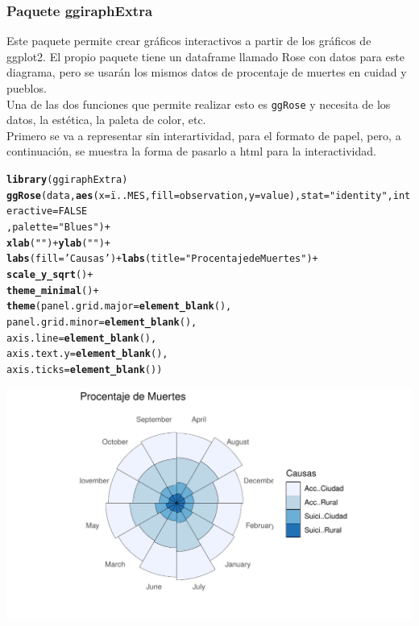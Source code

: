 \documentclass{article}\usepackage[]{graphicx}\usepackage[]{color}
\makeatletter
\def\maxwidth{ %
  \ifdim\Gin@nat@width>\linewidth
    \linewidth
  \else
    \Gin@nat@width
  \fi
}
\newcommand{\hlnum}[1]{\textcolor[rgb]{0.686,0.059,0.569}{#1}}%
\newcommand{\hlstr}[1]{\textcolor[rgb]{0.192,0.494,0.8}{#1}}%
\newcommand{\hlopt}[1]{\textcolor[rgb]{0,0,0}{#1}}%
\newcommand{\hlstd}[1]{\textcolor[rgb]{0.345,0.345,0.345}{#1}}%
\newcommand{\hlkwc}[1]{\textcolor[rgb]{0.333,0.667,0.333}{#1}}%
\newcommand{\hlkwd}[1]{\textcolor[rgb]{0.737,0.353,0.396}{\textbf{#1}}}%
\newenvironment{kframe}{%
 \def\at@end@of@kframe{}%
 \ifinner\ifhmode%
  \def\at@end@of@kframe{\end{minipage}}%
  \begin{minipage}{\columnwidth}%
 \fi\fi%
 \def\FrameCommand##1{\hskip\@totalleftmargin \hskip-\fboxsep
 \colorbox{shadecolor}{##1}\hskip-\fboxsep
     \hskip-\linewidth \hskip-\@totalleftmargin \hskip\columnwidth}%
 \MakeFramed {\advance\hsize-\width
   \@totalleftmargin\z@ \linewidth\hsize
   \@setminipage}}%
 {\par\unskip\endMakeFramed%
 \at@end@of@kframe}
\newenvironment{knitrout}{}{} %
\makeatother
\begin{document}
\subsubsection{Paquete ggiraphExtra}
Este paquete %
permite crear gr\'aficos interactivos a partir de los gr\'aficos de ggplot2. El propio paquete tiene un dataframe llamado Rose con datos para este diagrama, pero se usar\'an los mismos datos de procentaje de muertes en cuidad y pueblos.~\\
Una de las dos funciones que permite realizar esto es \texttt{ggRose} y necesita de los datos, la est\'etica, la paleta de color, etc.~\\
Primero se va a representar sin interartividad, para el formato de papel, pero, a continuaci\'on, se muestra la forma de pasarlo a html para la interactividad.
\begin{knitrout}
\color{fgcolor}\begin{kframe}
\begin{alltt}
\hlkwd{library}\hlstd{(ggiraphExtra)}
\hlkwd{ggRose}\hlstd{(data,}\hlkwd{aes}\hlstd{(}\hlkwc{x}\hlstd{=ï..MES,}\hlkwc{fill}\hlstd{=observation,}\hlkwc{y}\hlstd{=value),}\hlkwc{stat}\hlstd{=}\hlstr{"identity"}\hlstd{,}\hlkwc{interactive}\hlstd{=}\hlnum{FALSE}
       \hlstd{,} \hlkwc{palette} \hlstd{=} \hlstr{"Blues"}\hlstd{)} \hlopt{+}
   \hlkwd{xlab}\hlstd{(}\hlstr{""}\hlstd{)} \hlopt{+}  \hlkwd{ylab}\hlstd{(}\hlstr{""}\hlstd{)} \hlopt{+}
  \hlkwd{labs}\hlstd{(}\hlkwc{fill}\hlstd{=}\hlstr{'Causas'}\hlstd{)} \hlopt{+} \hlkwd{labs}\hlstd{(}\hlkwc{title} \hlstd{=} \hlstr{"Procentaje de Muertes"}\hlstd{)} \hlopt{+}
  \hlkwd{scale_y_sqrt}\hlstd{()} \hlopt{+}
  \hlkwd{theme_minimal}\hlstd{()} \hlopt{+}
  \hlkwd{theme}\hlstd{(}\hlkwc{panel.grid.major} \hlstd{=} \hlkwd{element_blank}\hlstd{(),}
        \hlkwc{panel.grid.minor} \hlstd{=} \hlkwd{element_blank}\hlstd{(),}
        \hlkwc{axis.line} \hlstd{=} \hlkwd{element_blank}\hlstd{(),}
        \hlkwc{axis.text.y} \hlstd{=} \hlkwd{element_blank}\hlstd{(),}
        \hlkwc{axis.ticks} \hlstd{=} \hlkwd{element_blank}\hlstd{())}
\end{alltt}
\end{kframe}

{\centering \includegraphics[width=\maxwidth]{figure/plot_rose_ggiraph-1} 

}



\end{knitrout}
\end{document}
